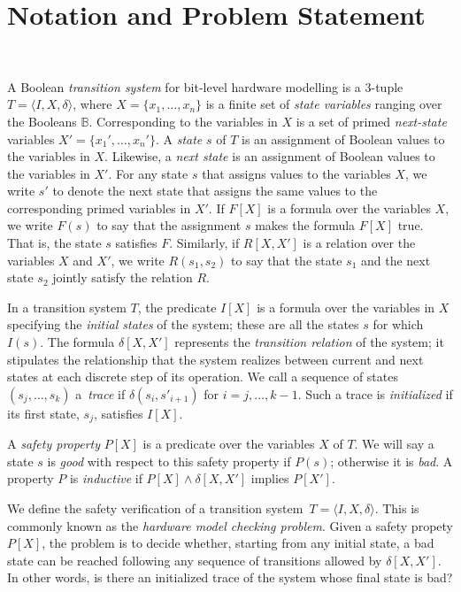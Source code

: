 \section{Notation and Problem Statement}~\label{sec:notation}

A Boolean \textit{transition system} for bit-level hardware
modelling is a 3-tuple $T = \langle I,X,\delta \rangle$, where $X = \{x_1,\dots ,x_n\}$
is a finite set of \textit{state variables} ranging over the Booleans $\mathbb{B}$. 
%
Corresponding to the variables in $X$ is a set of primed \textit{next-state} variables  $X' = \{x_1', \dots, x_n'\}$.
% 
A \textit{state} $s$ of $T$ is an assignment of Boolean values to the variables in $X$. Likewise, a \textit{next state} is an assignment of Boolean values to the variables in $X'$.  For any state $s$ that assigns values to the  variables $X$, we write $s'$ to denote the next state that assigns the same values to the corresponding primed variables in $X'$. If $F[X]$ is a formula over the variables $X$, we write $F(s)$ to say that
the assignment $s$ makes the formula $F[X]$ true. That is, the state $s$ satisfies $F$. Similarly, if $R[X,X']$ is a relation over the variables $X$ and $X'$, we write $R(s_1,s_2)$ to say that the state $s_1$ and the next state $s_2$ jointly satisfy the relation $R$.

In a transition system $T$, the predicate $I[X]$ is a formula over
the variables in $X$ specifying the \textit{initial states} of the system; these are all the states $s$ for which
$I(s)$. The formula $\delta[X,X']$ represents the \textit{transition relation} of the system; it stipulates the relationship that the system 
realizes between current and next states at each discrete step of its operation. 
% 
We call a sequence of states $(s_j,\dots,s_k)$ a~\textit{trace} 
if $\delta(s_i,s'_{i{+}1})$ for $i=j,\dots,k-1$.  Such a trace is 
\textit{initialized} if its first state, $s_j$, satisfies $I[X]$.  
  
A \textit{safety property} $P[X]$ is a predicate over the variables $X$ of $T$.  We will say a state $s$ is \textit{good} with respect to this safety property if 
$P(s)$; otherwise it is \textit{bad}. A property $P$ is \textit{inductive} if $P[X] \wedge \delta[X,X']$ implies $P[X']$.    
%

We define the safety verification of a transition system~$T = \langle I,X,\delta\rangle$.
This is commonly known as the \textit{hardware model checking problem}.  
Given a safety propety $P[X]$, the problem is to decide whether, starting from any initial state, a bad state can be reached following any sequence of transitions allowed by $\delta[X,X']$. In other words, is there an initialized trace of the system whose
final state is bad?
%
